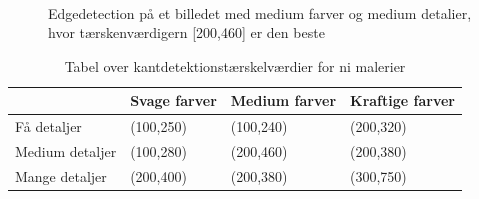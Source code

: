\begin{figure}[!h]
    \centering
    \\
        \caption[]{Edgedetection på et billedet med medium farver og medium detalier, hvor tærskenværdigern [200,460] er den beste}
     \label{tre}
\end{figure}

\begin{table}[!h]
    \centering
    \begin{tabular}{| l | l | l | l |} \hline
        & Svage farver 	& Medium farver & Kraftige farver \\ \hline
        Få detaljer 		& (100,250)		& (100,240)		& (200,320)\\ \hline
        Medium detaljer 	& (100,280)		& (200,460)		& (200,380)\\ \hline
        Mange detaljer		& (200,400)		& (200,380)		& (300,750)\\ \hline
    \end{tabular}
    \caption{Tabel over kantdetektionstærskelværdier for ni malerier}
    \label{thressholdsTabelKant}
\end{table}

